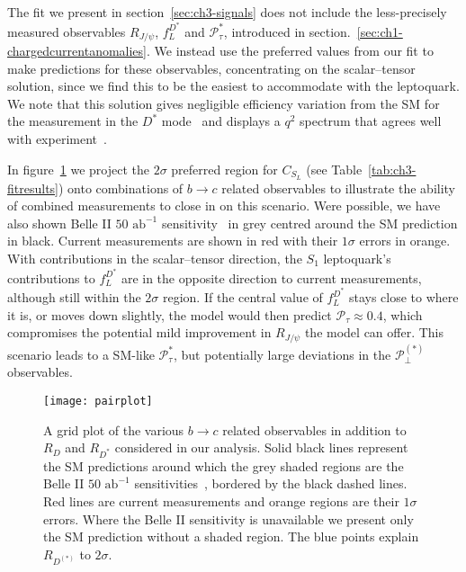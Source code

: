 The fit we present in section~\ref{sec:ch3-signals} does not include the
less-precisely measured observables $R_{J/\psi}$, $f_L^{D^*}$ and
$\mathcal{P}_\tau^*$, introduced in
section.~\ref{sec:ch1-chargedcurrentanomalies}. We instead use the preferred
values from our fit to make predictions for these observables, concentrating on
the scalar--tensor solution, since we find this to be the easiest to accommodate
with the leptoquark. We note that this solution gives negligible efficiency
variation from the SM for the measurement in the $D^*$ mode~\cite{Sato:2016svk}
and displays a $q^2$ spectrum that agrees well with
experiment~\cite{Freytsis:2015qca}.

In figure~\ref{fig:ch3-btocpredictions} we project the $2\sigma$ preferred
region for $C_{S_L}$ (see Table~\ref{tab:ch3-fitresults}) onto combinations of
$b \to c$ related observables to illustrate the ability of combined measurements
to close in on this scenario. Were possible, we have also shown Belle II
$50 \text{ ab}^{-1}$ sensitivity~\cite{Alonso:2017ktd} in grey centred around
the SM prediction in black. Current measurements are shown in red with their
$1 \sigma$ errors in orange. With contributions in the scalar--tensor direction,
the $S_{1}$ leptoquark's contributions to $f_L^{D^*}$ are in the opposite
direction to current measurements, although still within the $2\sigma$ region.
If the central value of $f_L^{D^*}$ stays close to where it is, or moves down
slightly, the model would then predict $\mathcal{P}_\tau \approx 0.4$, which
compromises the potential mild improvement in $R_{J/\psi}$ the model can offer.
This scenario leads to a SM-like $\mathcal{P}_{\tau}^*$, but potentially large
deviations in the $\mathcal{P}_{\perp}^{(*)}$ observables.

\begin{figure}[t]
  \centering
  \texttt{[image: pairplot]}
  \caption{A grid plot of the various $b \to c$ related observables in addition
    to $R_{D}$ and $R_{D^*}$ considered in our analysis. Solid black lines
    represent the SM predictions around which the grey shaded regions are the
    Belle II $50 \text{ ab}^{-1}$ sensitivities~\cite{Alonso:2017ktd}, bordered
    by the black dashed lines. Red lines are current measurements and orange
    regions are their $1\sigma$ errors. Where the Belle II sensitivity is
    unavailable we present only the SM prediction without a shaded region. The
    blue points explain $R_{D^{(*)}}$ to $2 \sigma$.}
  \label{fig:ch3-btocpredictions}
\end{figure}


